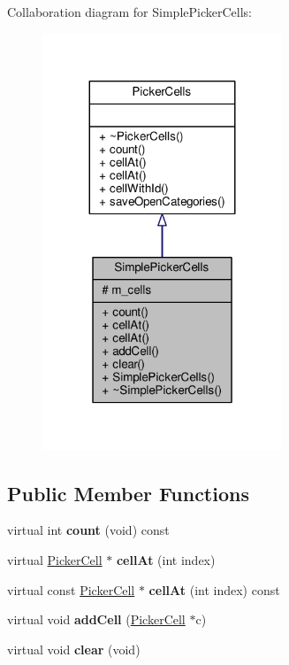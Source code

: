 Collaboration diagram for Simple\+Picker\+Cells\+:
\nopagebreak
\begin{figure}[H]
\begin{center}
\leavevmode
\includegraphics[width=203pt]{d6/da9/classSimplePickerCells__coll__graph}
\end{center}
\end{figure}
\subsection*{Public Member Functions}
\begin{DoxyCompactItemize}
\item 
virtual int {\bfseries count} (void) const \hypertarget{classSimplePickerCells_a41e3a6ba32738d74c388b12de70c20de}{}\label{classSimplePickerCells_a41e3a6ba32738d74c388b12de70c20de}

\item 
virtual \hyperlink{classPickerCell}{Picker\+Cell} $\ast$ {\bfseries cell\+At} (int index)\hypertarget{classSimplePickerCells_a7cf58f4e25890317d2329739fa243275}{}\label{classSimplePickerCells_a7cf58f4e25890317d2329739fa243275}

\item 
virtual const \hyperlink{classPickerCell}{Picker\+Cell} $\ast$ {\bfseries cell\+At} (int index) const \hypertarget{classSimplePickerCells_a63aea779cfc2c52534e2614aa5d6e995}{}\label{classSimplePickerCells_a63aea779cfc2c52534e2614aa5d6e995}

\item 
virtual void {\bfseries add\+Cell} (\hyperlink{classPickerCell}{Picker\+Cell} $\ast$c)\hypertarget{classSimplePickerCells_aef8ce430392639dadf3a1b615b543d88}{}\label{classSimplePickerCells_aef8ce430392639dadf3a1b615b543d88}

\item 
virtual void {\bfseries clear} (void)\hypertarget{classSimplePickerCells_a546b8a75e4280e1dbec3a7191354a064}{}\label{classSimplePickerCells_a546b8a75e4280e1dbec3a7191354a064}

\end{DoxyCompactItemize}
